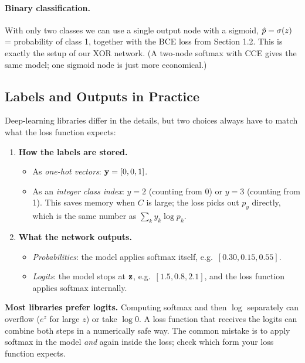 \documentclass[12pt, a4paper]{article}
\begin{document}
\paragraph{Binary classification.}
With only two classes we can use a single output node with a sigmoid,
$\hat{p} = \sigma(z)$ = probability of class 1, together with the BCE
loss from Section 1.2. This is exactly the setup of our XOR network. (A
two-node softmax with CCE gives the same model; one sigmoid node is just more
economical.)

\subsection{Labels and Outputs in Practice}

Deep-learning libraries differ in the details, but two choices always have to
match what the loss function expects:

\begin{enumerate}
  \item \textbf{How the labels are stored.}
        \begin{itemize}[nosep]
          \item As \emph{one-hot vectors}: $\mathbf{y} = [0, 0, 1]$.
          \item As an \emph{integer class index}: $y = 2$ (counting from 0)
                or $y = 3$ (counting from 1). This saves memory when $C$ is
                large; the loss picks out $p_y$ directly, which is the same
                number as $\sum_k y_k \log p_k$.
        \end{itemize}
  \item \textbf{What the network outputs.}
        \begin{itemize}[nosep]
          \item \emph{Probabilities}: the model applies softmax itself,
                e.g.\ $[0.30, 0.15, 0.55]$.
          \item \emph{Logits}: the model stops at $\mathbf{z}$,
                e.g.\ $[1.5, 0.8, 2.1]$, and the loss function applies
                softmax internally.
        \end{itemize}
\end{enumerate}

\begin{warnbox}
  \textbf{Most libraries prefer logits.} Computing softmax and then $\log$
  separately can overflow ($e^{z}$ for large $z$) or take $\log 0$. A loss
  function that receives the logits can combine both steps in a numerically
  safe way. The common mistake is to apply softmax in the model \emph{and}
  again inside the loss; check which form your loss function expects.
\end{warnbox}
\end{document}
